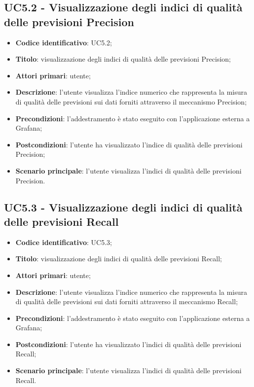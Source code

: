 \subsection{UC5.2 - Visualizzazione degli indici di qualità delle previsioni Precision}
\begin{itemize}
	\item \textbf{Codice identificativo}: UC5.2;
	\item \textbf{Titolo}: visualizzazione degli indici di qualità delle previsioni Precision\glo;
	\item \textbf{Attori primari}: utente;
	\item \textbf{Descrizione}: l'utente visualizza l'indice numerico che rappresenta la misura di qualità delle previsioni sui dati forniti attraverso il meccanismo Precision\glo;
	\item \textbf{Precondizioni}: l'addestramento è stato eseguito con l'applicazione esterna a Grafana\glo;
	\item \textbf{Postcondizioni}: l'utente ha visualizzato l'indice di qualità delle previsioni Precision\glo;
	\item \textbf{Scenario principale}: l'utente visualizza l'indici di qualità delle previsioni Precision\glo.
\end{itemize} 
\subsection{UC5.3 - Visualizzazione degli indici di qualità delle previsioni Recall}
\begin{itemize}
	\item \textbf{Codice identificativo}: UC5.3;
	\item \textbf{Titolo}: visualizzazione degli indici di qualità delle previsioni Recall\glo;
	\item \textbf{Attori primari}: utente;
	\item \textbf{Descrizione}: l'utente visualizza l'indice numerico che rappresenta la misura di qualità delle previsioni sui dati forniti attraverso il meccanismo Recall\glo;
	\item \textbf{Precondizioni}: l'addestramento è stato eseguito con l'applicazione esterna a Grafana\glo;
	\item \textbf{Postcondizioni}: l'utente ha visualizzato l'indici di qualità delle previsioni Recall\glo;
	\item \textbf{Scenario principale}: l'utente visualizza l'indici di qualità delle previsioni Recall\glo.
\end{itemize} 
